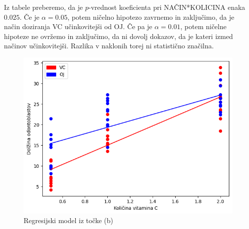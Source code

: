 \documentclass[10pt, a4paper]{article}
\begin{document}
Iz tabele preberemo, da je $p$-vrednost koeficienta pri NAČIN*KOLICINA enaka $0.025$.
Če je $\alpha = 0.05$, potem ničelno hipotezo zavrnemo in zaključimo, da je način doziranja VC 
učinkovitejši od OJ. Če pa je $\alpha = 0.01$, potem ničelne hipoteze ne ovržemo in zaključimo, da ni dovolj dokazov,
da je kateri izmed načinov učinkovitejši. Razlika v naklonih torej ni statistično značilna.

\begin{figure}[H]
    \centering
    \includegraphics[scale=0.75]{Images/3b.png}
    {\caption{Regresijski model iz točke (b)}}
\end{figure}



\end{document}
